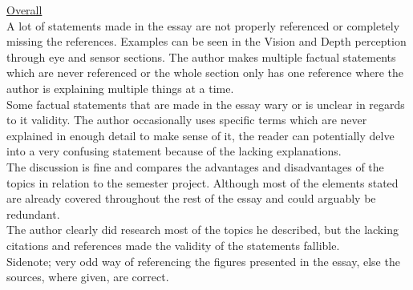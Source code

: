 \underline{Overall}\\
A lot of statements made in the essay are not properly referenced or completely missing the references. Examples can be seen in the Vision and Depth perception through eye and sensor sections. The author makes multiple factual statements which are never referenced or the whole section only has one reference where the author is explaining multiple things at a time.\\Some factual statements that are made in the essay wary or is unclear in regards to it validity. The author occasionally uses specific terms which are never explained in enough detail to make sense of it, the reader can potentially delve into a very confusing statement because of the lacking explanations.\\ The discussion is fine and compares the advantages and disadvantages of the topics in relation to the semester project. Although most of the elements stated are already covered throughout the rest of the essay and could arguably be redundant.\\The author clearly did research most of the topics he described, but the lacking citations and references made the validity of the statements fallible.\\Sidenote; very odd way of referencing the figures presented in the essay, else the sources, where given, are correct.
